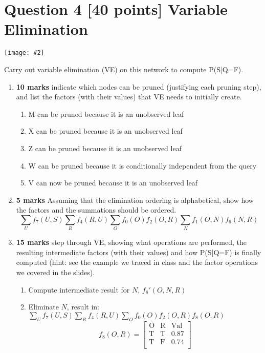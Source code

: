 \documentclass{article}
\def\ans#1{{\color{ans}#1}}
\newcommand{\mat}[1]{\begin{bmatrix}#1\end{bmatrix}}
\newcommand{\centerfig}[2]{\begin{center}\texttt{[image: \#2]}\end{center}}
\begin{document}
\section{Question 4 [40 points] Variable Elimination}
\centerfig{1}{../figs/fig3}
Carry out variable elimination (VE) on this network to compute P(S|Q=F). \\
\begin{enumerate}[label=\arabic*.]
    \item \textbf{10 marks} indicate which nodes can be pruned (justifying each pruning step), and list the factors (with their values) that VE needs to initially create.
    \ans{
        \begin{enumerate}[label=\arabic*.]
            \item M can be pruned because it is an unobserved leaf
            \item X can be pruned because it is an unobserved leaf
            \item Z can be pruned because it is an unobserved leaf
            \item W can be pruned because it is conditionally independent from the query
            \item V can now be pruned because it is an unobserved leaf
        \end{enumerate}
    }
    \item \textbf{5 marks} Assuming that the elimination ordering is alphabetical, show how the factors and the summations should be ordered. \\
    \ans{
        \[ \sum_U f_7(U,S) \sum_R f_4(R,U) \sum_O f_0(O) f_2(O,R) \sum_N f_1(O,N) f_6(N,R)\]
    }
    \item \textbf{15 marks} step through VE, showing what operations are performed, the resulting intermediate factors (with their values) and how P(S|Q=F) is finally computed (hint: see the example we traced in class and the factor operations we covered in the slides).
    \ans{
        \begin{enumerate}[label=\arabic*.]
            \item Compute intermediate result for $N$, $f_8'(O,N,R)$
            \item Eliminate $N$, result in: $\sum_U f_7(U,S) \sum_R f_4(R,U) \sum_O f_0(O) f_2(O,R) f_8(O,R)$
            \[
                f_8(O,R) = \mat{
                    \text{O} & \text{R} & \text{Val} \\
                    \text{T} & \text{T} & 0.87 \\
                    \text{T} & \text{F} & 0.74 \\
}\]
\end{enumerate}}
\end{enumerate}
\end{document}

